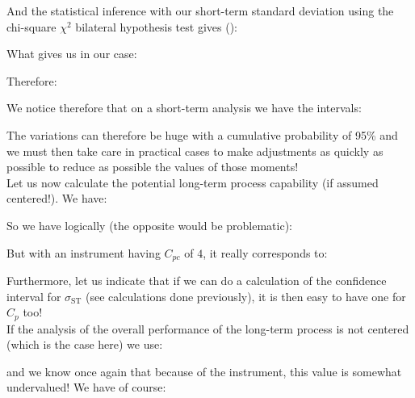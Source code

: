 	\pagebreak
	\begin{tcolorbox}[colframe=black,colback=white,sharp corners]
	And the statistical inference with our short-term standard deviation using the chi-square $\chi^2$ bilateral hypothesis test gives ():
	
	What gives us in our case:
	
	Therefore:
	
	We notice therefore that on a short-term analysis we have the intervals:
	 
	The variations can therefore be huge with a cumulative probability of 95\% and we must then take care in practical cases to make adjustments as quickly as possible to reduce as possible the values of those moments!\\
		
	Let us now calculate the potential long-term process capability (if assumed centered!).
	We have:
	
	So we have logically (the opposite would be problematic):
	
	But with an instrument having $C_{pc}$ of $4$, it really corresponds to:
	
	Furthermore, let us indicate that if we can do a calculation of the confidence interval for $\sigma_{\text{ST}}$ (see calculations done previously), it is then easy to have one for $C_p$ too!\\
	
	If the analysis of the overall performance of the long-term process is not centered (which is the case here)  we use:
		
	and we know once again that because of the instrument, this value is somewhat undervalued! We have of course:
	\end{tcolorbox}
	
